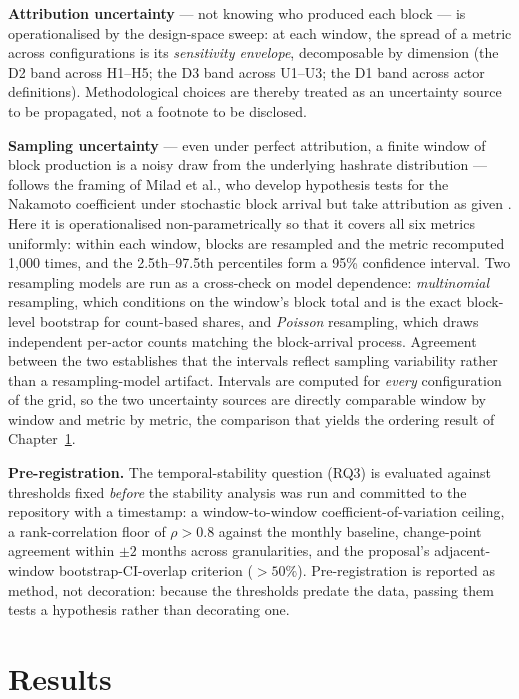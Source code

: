 \documentclass[logo,msc]{infthesis}           %
\begin{document}
\textbf{Attribution uncertainty} --- not knowing who produced each block ---
is operationalised by the design-space sweep: at each window, the spread of a
metric across configurations is its \emph{sensitivity envelope}, decomposable
by dimension (the D2 band across H1--H5; the D3 band across U1--U3; the D1
band across actor definitions). Methodological choices are thereby treated as
an uncertainty source to be propagated, not a footnote to be disclosed.
 
\textbf{Sampling uncertainty} --- even under perfect attribution, a finite
window of block production is a noisy draw from the underlying hashrate
distribution --- follows the framing of Milad et al., who develop hypothesis
tests for the Nakamoto coefficient under stochastic block arrival but take
attribution as given \cite{milad2024statistical}. Here it is operationalised
non-parametrically so that it covers all six metrics uniformly: within each
window, blocks are resampled and the metric recomputed 1{,}000 times, and the
2.5th--97.5th percentiles form a 95\% confidence interval. Two resampling
models are run as a cross-check on model dependence: \emph{multinomial}
resampling, which conditions on the window's block total and is the exact
block-level bootstrap for count-based shares, and \emph{Poisson} resampling,
which draws independent per-actor counts matching the block-arrival process.
Agreement between the two establishes that the intervals reflect sampling
variability rather than a resampling-model artifact. Intervals are computed
for \emph{every} configuration of the grid, so the two uncertainty sources are
directly comparable window by window and metric by metric, the comparison
that yields the ordering result of Chapter~\ref{ch:results}.
 
\textbf{Pre-registration.} The temporal-stability question (RQ3) is evaluated
against thresholds fixed \emph{before} the stability analysis was run and
committed to the repository with a timestamp: a window-to-window
coefficient-of-variation ceiling, a rank-correlation floor of $\rho > 0.8$
against the monthly baseline, change-point agreement within $\pm 2$ months
across granularities, and the proposal's adjacent-window bootstrap-CI-overlap
criterion ($>50\%$). Pre-registration is reported as method, not decoration:
because the thresholds predate the data, passing them tests a hypothesis
rather than decorating one.

\chapter{Results}
\label{ch:results}
 
\end{document}
